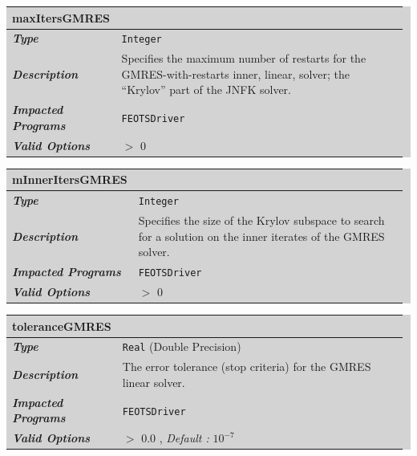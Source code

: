 \documentclass{softwaremanual}
\begin{document}
\noindent\begingroup\setlength{\fboxsep}{0pt}
\colorbox{lightgray}{
\begin{tabular}{p{0.25\linewidth} p{0.725\linewidth}}
\toprule
\textbf{maxItersGMRES} & \\
\midrule
\textbf{\textit{Type}} & \texttt{Integer} \\
\midrule
\textbf{\textit{Description}} & Specifies the maximum number of restarts for the GMRES-with-restarts inner, linear, solver; the ``Krylov'' part of the JNFK solver. \\
\midrule
\textbf{\textit{Impacted Programs}} & \texttt{FEOTSDriver} \\
\midrule
\textbf{\textit{Valid Options}}  & $>$ 0\\
\bottomrule
\end{tabular}
}\endgroup

\noindent\begingroup\setlength{\fboxsep}{0pt}
\colorbox{lightgray}{
\begin{tabular}{p{0.25\linewidth} p{0.725\linewidth}}
\toprule
\textbf{mInnerItersGMRES} & \\
\midrule
\textbf{\textit{Type}} & \texttt{Integer} \\
\midrule
\textbf{\textit{Description}} & Specifies the size of the Krylov subspace to search for a solution on the inner iterates of the GMRES solver. \\
\midrule
\textbf{\textit{Impacted Programs}} & \texttt{FEOTSDriver} \\
\midrule
\textbf{\textit{Valid Options}}  & $>$ 0\\
\bottomrule
\end{tabular}
}\endgroup

\noindent\begingroup\setlength{\fboxsep}{0pt}
\colorbox{lightgray}{
\begin{tabular}{p{0.25\linewidth} p{0.725\linewidth}}
\toprule
\textbf{toleranceGMRES} & \\
\midrule
\textbf{\textit{Type}} & \texttt{Real} (Double Precision) \\
\midrule
\textbf{\textit{Description}} & The error tolerance (stop criteria) for the GMRES linear solver. \\
\midrule
\textbf{\textit{Impacted Programs}} & \texttt{FEOTSDriver} \\
\midrule
\textbf{\textit{Valid Options}}  & $>$ 0.0 , \textit{Default :} $10^{-7}$\\
\bottomrule
\end{tabular}
}\endgroup
\end{document}

